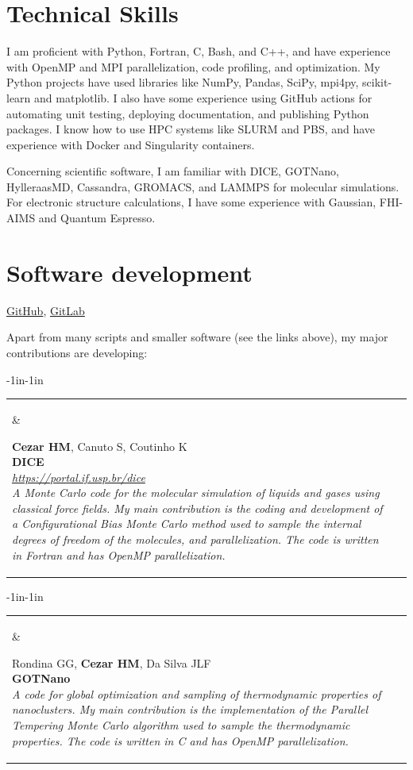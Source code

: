 \documentclass[10pt]{article}
\newcommand{\newsoftware}[3]{
\begin{adjustwidth}{-1in}{-1in}  
\begin{tabular}{p{0.9in}p{7in}}
\parbox[c]{0.9in}{} & \parbox[c]{6in}{\setstretch{0.9} {\scriptsize {#1}} \\ {\bf #2}  \\ {\footnotesize\emph {#3}}}
\end{tabular}
\end{adjustwidth}
\vspace{0.2in}
}
\begin{document}
\section*{Technical Skills}
I am proficient with Python, Fortran, C, Bash, and C++, and have experience with OpenMP and MPI parallelization, code profiling, and optimization. 
My Python projects have used libraries like NumPy, Pandas, SciPy, mpi4py, scikit-learn and matplotlib.
I also have some experience using GitHub actions for automating unit testing, deploying documentation, and publishing Python packages.
I know how to use HPC systems like SLURM and PBS, and have experience with Docker and Singularity containers.

Concerning scientific software, I am familiar with DICE, GOTNano, HylleraasMD, Cassandra, GROMACS, and LAMMPS for molecular simulations. 
For electronic structure calculations, I have some experience with Gaussian, FHI-AIMS and Quantum Espresso.


\eject



\section*{Software development}
\href{https://github.com/hmcezar}{GitHub}, 
\href{https://gitlab.com/hmcezar}{GitLab}

Apart from many scripts and smaller software (see the links above), my major contributions are developing:\\

\newsoftware{\textbf{Cezar HM}, Canuto S, Coutinho K}{DICE}{\href{https://portal.if.usp.br/dice}{https://portal.if.usp.br/dice} \\ 
A Monte Carlo code for the molecular simulation of liquids and gases using classical force fields. My main contribution is the coding and development of a Configurational Bias Monte Carlo method used to sample the internal degrees of freedom of the molecules, and parallelization. The code is written in Fortran and has OpenMP parallelization.}

\newsoftware{Rondina GG, \textbf{Cezar HM}, Da Silva JLF}{GOTNano}{ 
A code for global optimization and sampling of thermodynamic properties of nanoclusters. My main contribution is the implementation of the Parallel Tempering Monte Carlo algorithm used to sample the thermodynamic properties. The code is written in C and has OpenMP parallelization.}
\end{document}
